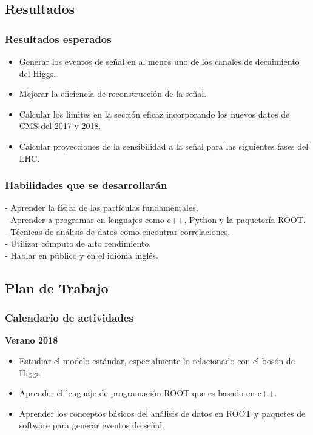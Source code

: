 \documentclass[11pt]{beamer}
\begin{document}
\begin{frame}
\section{Resultados}
\frametitle{Resultados esperados}
\begin{itemize}
 \item Generar los eventos de señal en al menos uno de los canales de decaimiento del
Higgs.
 \item Mejorar la eficiencia de reconstrucción de la señal.
\item Calcular los limites en la sección eficaz incorporando los nuevos datos de CMS
del 2017 y 2018.
\item Calcular proyecciones de la sensibilidad a la señal para las siguientes fases del
LHC.
\end{itemize}
\end{frame}




\begin{frame}
\frametitle{Habilidades que se desarrollar\'an}
- Aprender la física de las partículas fundamentales. \\
- Aprender a programar en lenguajes como c++, Python y la paqueter\'ia ROOT.\\
- Técnicas de análisis de datos como encontrar correlaciones.\\
- Utilizar cómputo de alto rendimiento.\\
- Hablar en público y en el idioma ingl\'es.
\end{frame}


\begin{frame}
\section{Plan de Trabajo}
\frametitle{Calendario de actividades}
\textbf{Verano 2018}
\begin{itemize}
\item Estudiar el modelo estándar, especialmente lo relacionado con el bosón de Higgs
\item Aprender el lenguaje de programación ROOT que es basado en c++.
\item Aprender los conceptos básicos del análisis de datos en ROOT y paquetes de
software para generar eventos de señal.
\end{itemize}
\end{frame}
\end{document}
